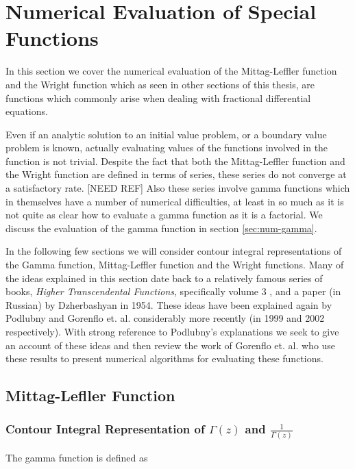 \section{Numerical Evaluation of Special Functions}

In this section we cover the numerical evaluation of the Mittag-Leffler function and the Wright function
which as seen in other sections of this thesis, are functions which commonly arise when dealing with
fractional differential equations.

Even if an analytic solution to an initial value problem, or a boundary value problem is known, actually
evaluating values of the functions involved in the function is not trivial. Despite the fact that both
the Mittag-Leffler function and the Wright function are defined in terms of series, these series do not 
converge at a satisfactory rate. [NEED REF] Also these series involve gamma functions which in themselves
have a number of numerical difficulties, at least in so much as it is not quite as clear how to evaluate 
a gamma function as it is a factorial. We discuss the evaluation of the gamma function in section \ref{sec:num-gamma}.

In the following few sections we will consider contour integral representations of the Gamma function, Mittag-Leffler 
function and the Wright functions. Many of the ideas explained in this section date back to a relatively famous series of books,
\emph{Higher Transcendental Functions}, specifically volume 3 \cite{Bateman1955}, and a paper (in Russian) by Dzherbashyan \cite{Dzherbashyan1954} in 1954. 
These ideas have been explained again by Podlubny \cite{Podlubny1999} and Gorenflo et. al. \cite{Gorenflo2002} considerably more recently (in 1999 and 2002 respectively). With strong reference to Podlubny's explanations we seek to give an account of these ideas and then review the work of  Gorenflo et. al. who use these results to present numerical algorithms for evaluating these functions. 

 
\subsection{Mittag-Lefller Function}
\subsubsection{Contour Integral Representation of $ \Gamma(z) $ and $ \frac{1}{\Gamma(z)} $}

The gamma function is defined as


